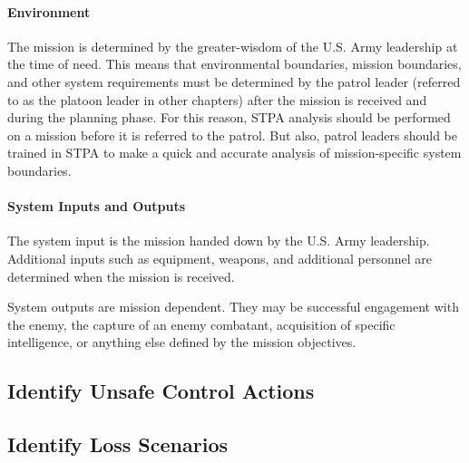 \documentclass[../../main/main.tex]{subfiles}
\begin{document}
\paragraph*{Environment}
The mission is determined by the greater-wisdom of the U.S. Army leadership at the time of need.  This means that environmental boundaries, mission boundaries, and other system requirements must be determined by the patrol leader  (referred to as the platoon leader in other chapters) after the mission is received and during the planning phase.  For this reason, STPA analysis should be performed on a mission before it is referred to the patrol.  But also, patrol leaders should be trained in STPA to make a quick and accurate analysis of mission-specific system boundaries.  


\paragraph*{System Inputs and Outputs}
The system input is the mission handed down by the U.S. Army leadership.  Additional inputs such as equipment, weapons, and additional personnel are determined when the mission is received. 

System outputs are mission dependent.  They may be successful engagement with the enemy, the capture of an enemy combatant, acquisition of specific intelligence, or anything else defined by the mission objectives.




\subsection{Identify Unsafe Control Actions}
\subsection{Identify Loss Scenarios}
\end{document}
